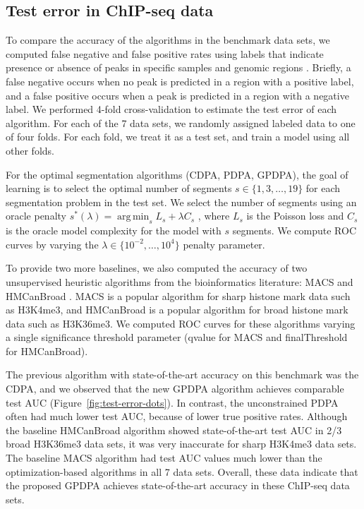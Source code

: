 \documentclass{article}
\DeclareMathOperator*{\argmin}{arg\,min}
\begin{document}
\subsection{Test error in ChIP-seq data}

To compare the accuracy of the algorithms in the benchmark data sets,
we computed false negative and false positive rates using labels
that indicate presence or absence of peaks in specific samples and
genomic regions \citep{HOCKING2016-chipseq}. Briefly, a false negative
occurs when no peak is predicted in a region with a positive label,
and a false positive occurs when a peak is predicted in a region with
a negative label.  We performed 4-fold cross-validation to
estimate the test error of each algorithm. For each of the 7 data
sets, we randomly assigned labeled data to one of four folds. For each
fold, we treat it as a test set, and train a model using all other
folds.

For the optimal segmentation algorithms (CDPA, PDPA, GPDPA), the goal
of learning is to select the optimal number of segments
$s\in \{1, 3,\dots, 19\}$ for each segmentation problem in the test
set. We select the number of segments using an oracle penalty
$s^*(\lambda)=\argmin_s L_s + \lambda C_s$
\citep{cleynen2013segmentation}, where $L_s$ is the Poisson loss and
$C_s$ is the oracle model complexity for the model with $s$
segments. We compute ROC curves by varying the
$\lambda\in\{10^{-2}, \dots,10^4\}$ penalty parameter.

To provide two more baselines, we also computed the accuracy of two
unsupervised heuristic algorithms from the bioinformatics literature:
MACS and HMCanBroad \citep{MACS, HMCan}. MACS is a popular algorithm
for sharp histone mark data such as H3K4me3, and HMCanBroad is a
popular algorithm for broad histone mark data such as H3K36me3. We
computed ROC curves for these algorithms varying a single significance
threshold parameter (qvalue for MACS and finalThreshold for
HMCanBroad).

The previous algorithm with state-of-the-art accuracy on this
benchmark was the CDPA, and we observed that the new GPDPA algorithm
achieves comparable test AUC (Figure~\ref{fig:test-error-dots}). In
contrast, the unconstrained PDPA often had much lower test AUC,
because of lower true positive rates. Although the baseline HMCanBroad
algorithm showed state-of-the-art test AUC in 2/3 broad H3K36me3 data
sets, it was very inaccurate for sharp H3K4me3 data sets. The baseline
MACS algorithm had test AUC values much lower than the
optimization-based algorithms in all 7 data sets. Overall, these data
indicate that the proposed GPDPA achieves state-of-the-art accuracy in
these ChIP-seq data sets.
\end{document}
